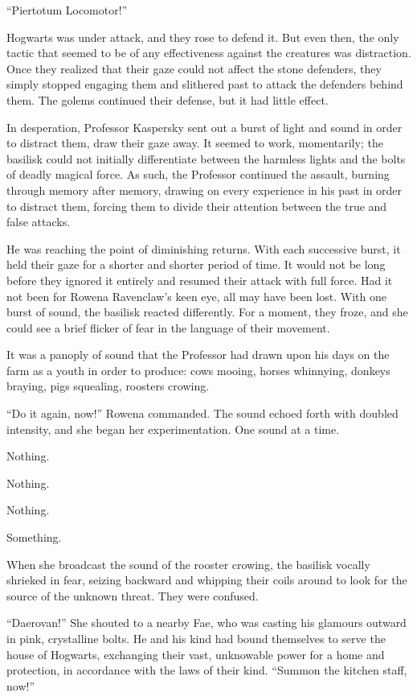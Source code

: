 “Piertotum Locomotor!”

Hogwarts was under attack, and they rose to defend it. But even then, the only tactic that seemed to be of any effectiveness against the creatures was distraction. Once they realized that their gaze could not affect the stone defenders, they simply stopped engaging them and slithered past to attack the defenders behind them. The golems continued their defense, but it had little effect.

In desperation, Professor Kaspersky sent out a burst of light and sound in order to distract them, draw their gaze away. It seemed to work, momentarily; the basilisk could not initially differentiate between the harmless lights and the bolts of deadly magical force. As such, the Professor continued the assault, burning through memory after memory, drawing on every experience in his past in order to distract them, forcing them to divide their attention between the true and false attacks.

He was reaching the point of diminishing returns. With each successive burst, it held their gaze for a shorter and shorter period of time. It would not be long before they ignored it entirely and resumed their attack with full force. Had it not been for Rowena Ravenclaw’s keen eye, all may have been lost. With one burst of sound, the basilisk reacted differently. For a moment, they froze, and she could see a brief flicker of fear in the language of their movement.

It was a panoply of sound that the Professor had drawn upon his days on the farm as a youth in order to produce: cows mooing, horses whinnying, donkeys braying, pigs squealing, roosters crowing.

“Do it again, now!” Rowena commanded. The sound echoed forth with doubled intensity, and she began her experimentation. One sound at a time.

Nothing.

Nothing.

Nothing.

Something.

When she broadcast the sound of the rooster crowing, the basilisk vocally shrieked in fear, seizing backward and whipping their coils around to look for the source of the unknown threat. They were confused.

“Daerovan!” She shouted to a nearby Fae, who was casting his glamours outward in pink, crystalline bolts. He and his kind had bound themselves to serve the house of Hogwarts, exchanging their vast, unknowable power for a home and protection, in accordance with the laws of their kind. “Summon the kitchen staff, now!”

